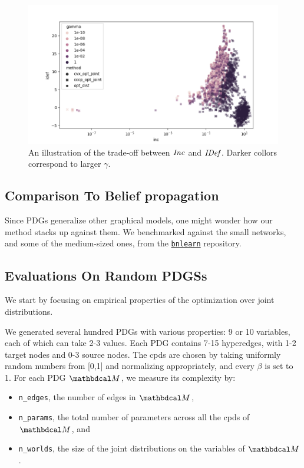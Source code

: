 \documentclass[twoside]{article}
\begin{document}
\begin{figure}
    \includegraphics[width=\linewidth]{figs/inc-idef2}
    \caption{An illustration of the trade-off between $\mathit{Inc}$ and $\mathit{IDef}_{\!}$. Darker collors correspond to larger $\gamma$.}\label{fig:inc-idef}
\end{figure}

\subsection{Comparison To Belief propagation}

Since PDGs generalize other graphical models, one might wonder how our method stacks up against them. 
We benchmarked against the small networks, and some of the medium-sized ones, from the \href{https://www.bnlearn.com/bnrepository/}{\texttt{bnlearn}} repository. 



\subsection{Evaluations On Random PDGSs}
We start by focusing on empirical properties of the optimization over joint distributions.

We generated several hundred PDGs with various properties: 9 or 10 variables, each of which can take 2-3 values. Each PDG contains 7-15 hyperedges, with 1-2 target nodes and 0-3 source nodes. The cpds are chosen by taking uniformly random numbers from [0,1] and normalizing appropriately, and every $\beta$ is set to 1.
For each PDG $\dg M$, we measure its complexity by:
\begin{itemize}[nosep]
    \item \texttt{n\_edges}, the number of edges in $\dg M$,
    \item \texttt{n\_params}, the total number of parameters across all the cpds of $\dg M$, and
    \item \texttt{n\_worlds}, the size of the joint distributions on the variables of $\dg M$.
\end{itemize}
\end{document}
